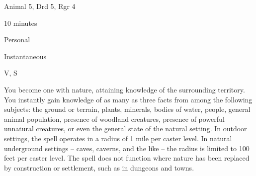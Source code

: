 
\begin{description*}
\item[Level:] Animal 5, Drd 5, Rgr 4
\item[Casting Time:] 10 minutes
\item[Range:] Personal
\item[Duration:] Instantaneous
\item[Components:] V, S
\end{description*}

You become one with nature, attaining knowledge of the surrounding territory. You
instantly gain knowledge of as many as three facts from among the following subjects:
the ground or terrain, plants, minerals, bodies of water, people, general animal
population, presence of woodland creatures, presence of powerful unnatural creatures,
or even the general state of the natural setting.
In outdoor settings, the spell operates in a radius of 1 mile per caster level.
In natural underground settings -- caves, caverns, and the like -- the radius is
limited to 100 feet per caster level. The spell does not function where nature
has been replaced by construction or settlement, such as in dungeons and towns.